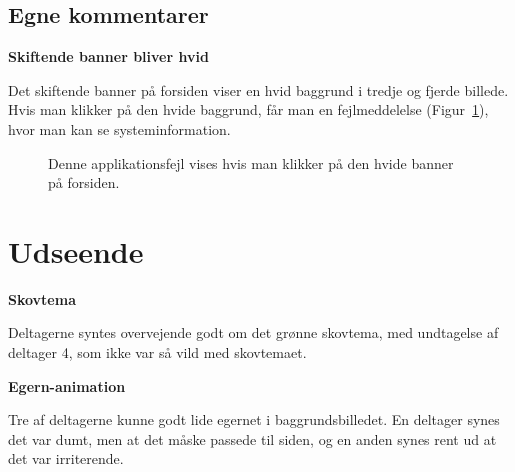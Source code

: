 \documentclass[10pt,a4paper]{article}      %
\newcommand{\kommentar}[2]{\item[#1] \textbf{#2}\par\nopagebreak}{}
\newcommand\pic[1]{\texttt{[image: Pics/\#1]}}
\renewcommand\good{\pic{good}}
\renewcommand\smallproblem{\pic{smallproblem}}
\renewcommand\seriousproblem{\pic{seriousproblem}}
\begin{document}
\subsection{Egne kommentarer} %
\label{sub:Egne kommentarer forsiden}

\begin{kommentarer}
  \kommentar{\seriousproblem}{Skiftende banner bliver hvid}

  Det skiftende banner på forsiden viser en hvid baggrund i tredje og fjerde
  billede. Hvis man klikker på den hvide baggrund, får man en fejlmeddelelse
  (Figur~\ref{fig:fejlmeddelelse}), hvor man kan se systeminformation.
\end{kommentarer}

\begin{figure}[htbp]
    \centering
    \caption{Denne applikationsfejl vises hvis man klikker på den hvide banner
    på forsiden.}
    \label{fig:fejlmeddelelse}
\end{figure}

\section{Udseende}
\begin{kommentarer}
  \kommentar{\good}{Skovtema}
  
  Deltagerne syntes overvejende godt om det grønne skovtema, med
  undtagelse af deltager 4, som ikke var så vild med skovtemaet.

  \kommentar{\smallproblem}{Egern-animation}
  
  Tre af deltagerne kunne godt lide egernet i baggrundsbilledet. En deltager
  synes det var dumt, men at det måske passede til siden, og en anden synes rent
  ud at det var irriterende.
\end{kommentarer}
\end{document}
